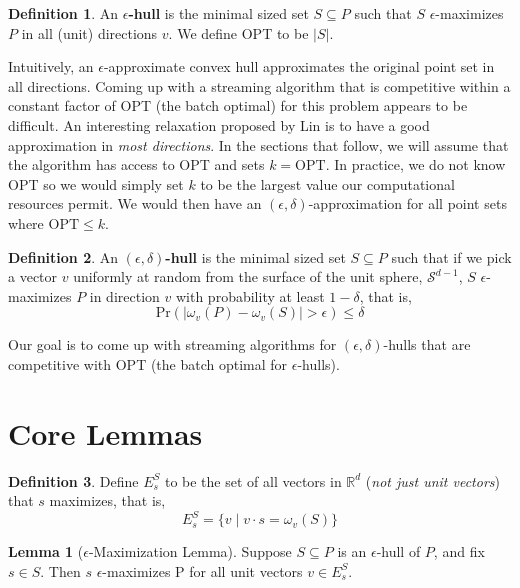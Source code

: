 \documentclass[12pt]{article}
\theoremstyle{definition}
\newtheorem{definition}{Definition}[section]
\theoremstyle{lemma}
\newtheorem{lemma}{Lemma}[section]
\theoremstyle{theorem}
\begin{document}
\begin{definition}
An \textbf{$\epsilon$-hull} is the minimal sized set $S \subseteq P$ such that $S$ $\epsilon$-maximizes $P$ in all (unit) directions $v$. We define OPT to be $|S|$.
\end{definition}

Intuitively, an $\epsilon$-approximate convex hull approximates the original point set in all directions. Coming up with a streaming algorithm that is competitive within a constant factor of OPT (the batch optimal) for this problem appears to be difficult. An interesting relaxation proposed by Lin is to have a good approximation in \emph{most directions}. In the sections that follow, we will assume that the algorithm has access to OPT and sets $k = \mbox{OPT}$. In practice, we do not know OPT so we would simply set $k$ to be the largest value our computational resources permit. We would then have an $(\epsilon, \delta)$-approximation for all point sets where $\mbox{OPT} \leq k$.

\begin{definition}
An \textbf{$(\epsilon, \delta)$-hull} is the minimal sized set $S \subseteq P$ such that if we pick a vector $v$ uniformly at random from the surface of the unit sphere, $\mathcal{S}^{d-1}$, $S$ $\epsilon$-maximizes $P$ in direction $v$ with probability at least $1-\delta$, that is,
\[ \mbox{Pr}(|\omega_v(P) - \omega_v(S)| > \epsilon) \leq \delta \]
\end{definition}

Our goal is to come up with streaming algorithms for $(\epsilon, \delta)$-hulls that are competitive with OPT (the batch optimal for $\epsilon$-hulls).

\section{Core Lemmas}

\begin{definition}
Define $E^S_s$ to be the set of all vectors in $\mathbb{R}^d$ (\emph{not just unit vectors}) that $s$ maximizes, that is,
\[ E^S_s = \{ v \; | \; v \cdot s = \omega_v(S) \} \]
\end{definition}

\begin{lemma}[$\epsilon$-Maximization Lemma] Suppose $S \subseteq P$ is an $\epsilon$-hull of $P$, and fix $s \in S$. Then $s$ $\epsilon$-maximizes P for all unit vectors $v \in E^S_s$.
\end{lemma}
\end{document}
